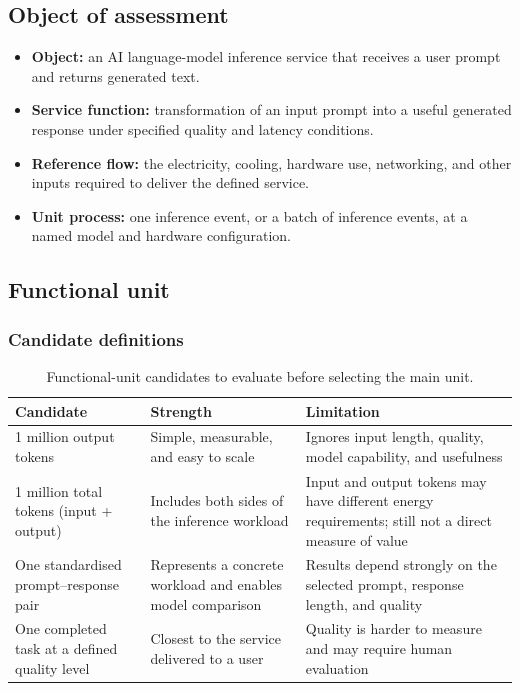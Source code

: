 \documentclass[11pt,a4paper]{article}
\begin{document}
\subsection{Object of assessment}
\begin{itemize}[leftmargin=*]
    \item \textbf{Object:} an AI language-model inference service that receives a
    user prompt and returns generated text.
    \item \textbf{Service function:} transformation of an input prompt into a
    useful generated response under specified quality and latency conditions.
    \item \textbf{Reference flow:} the electricity, cooling, hardware use,
    networking, and other inputs required to deliver the defined service.
    \item \textbf{Unit process:} one inference event, or a batch of inference
    events, at a named model and hardware configuration.
\end{itemize}

\subsection{Functional unit}

\subsubsection{Candidate definitions}
\begin{table}[htbp]
    \centering
    \begin{tabular}{p{} p{} p{}}
        \toprule
        Candidate & Strength & Limitation \\
        \midrule
        1 million output tokens & Simple, measurable, and easy to scale &
        Ignores input length, quality, model capability, and usefulness \\
        1 million total tokens (input + output) & Includes both sides of the
        inference workload & Input and output tokens may have different energy
        requirements; still not a direct measure of value \\
        One standardised prompt--response pair & Represents a concrete workload
        and enables model comparison & Results depend strongly on the selected
        prompt, response length, and quality \\
        One completed task at a defined quality level & Closest to the service
        delivered to a user & Quality is harder to measure and may require human
        evaluation \\
        \bottomrule
    \end{tabular}
    \caption{Functional-unit candidates to evaluate before selecting the main unit.}
    \label{tab:functional-unit-candidates}
\end{table}
\end{document}
